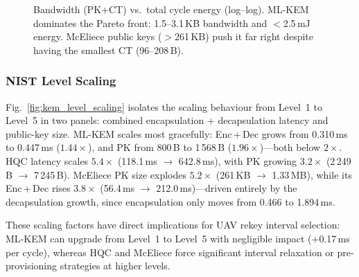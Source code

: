 \begin{figure}[t]
\caption{Bandwidth (PK+CT) vs.\ total cycle energy (log--log).
  ML-KEM dominates the Pareto front: 1.5--3.1\,KB bandwidth and
  $<$2.5\,mJ energy.  McEliece public keys ($>$261\,KB) push it
  far right despite having the smallest CT (96--208\,B).}
\label{fig:kem_pareto}
\end{figure}

\subsubsection{NIST Level Scaling}

Fig.~\ref{fig:kem_level_scaling} isolates the scaling behaviour
from Level~1 to Level~5 in two panels: combined encapsulation +
decapsulation latency and public-key size.
ML-KEM scales most gracefully: Enc\,+\,Dec grows from 0.310\,ms to
0.447\,ms ($1.44\times$), and PK from 800\,B to 1\,568\,B
($1.96\times$)---both below $2\times$.
HQC latency scales $5.4\times$ (118.1\,ms $\to$ 642.8\,ms),
with PK growing $3.2\times$ (2\,249\,B $\to$ 7\,245\,B).
McEliece PK size explodes $5.2\times$ (261\,KB $\to$ 1.33\,MB),
while its Enc\,+\,Dec rises $3.8\times$ (56.4\,ms $\to$
212.0\,ms)---driven entirely by the decapsulation growth, since
encapsulation only moves from 0.466 to 1.894\,ms.

These scaling factors have direct implications for UAV rekey
interval selection: ML-KEM can upgrade from Level~1 to Level~5
with negligible impact ($+$0.17\,ms per cycle), whereas HQC and
McEliece force significant interval relaxation or pre-provisioning
strategies at higher levels.

